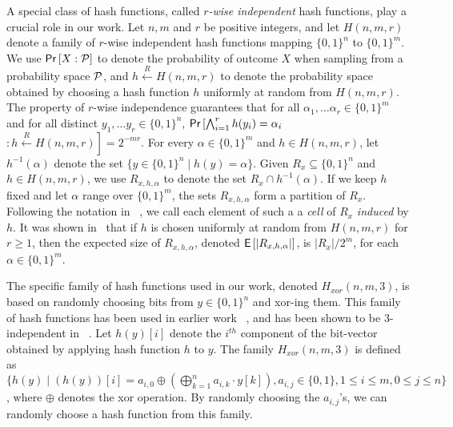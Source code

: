 %
%
%
A special class of hash functions, called \emph{$r$-wise independent} 
hash functions, play a crucial role in our work.
Let $n, m$ and $r$ be positive integers, and let $H(n,m,r)$ denote a
family of $r$-wise independent hash functions mapping $\{0, 1\}^n$ to $\{0, 1\}^m$.  We use 
$\mathsf{Pr}\left[X: {\cal P} \right]$ to denote the probability of outcome 
$X$ when sampling from a probability space ${\cal P}$, and 
$h \xleftarrow{R} H(n,m,r)$ to denote the probability space obtained by
choosing a hash function $h$ uniformly at random from $H(n,m,r)$. The 
property of $r$-wise independence guarantees 
that for all $\alpha_1, \ldots \alpha_r \in \{0,1\}^m $ and
for all distinct $y_1, \ldots y_r \in \{0,1\}^n$, 
$\mathsf{Pr}\left[\bigwedge_{i=1}^r h(y_i) = \alpha_i\right.$ $\left.: 
h \xleftarrow{R} H(n, m, r)\right] = 2^{-mr}$.  For every $\alpha \in
\{0, 1\}^m$ and $h \in H(n, m, r)$, let $h^{-1}(\alpha)$ denote the
set $\{y \in \{0, 1\}^n \mid h(y) = \alpha\}$.  Given $R_x \subseteq
\{0, 1\}^n$ and $h \in H(n, m, r)$, we use $R_{x, h, \alpha}$ to
denote the set $R_x \cap h^{-1}(\alpha)$.  If we keep $h$ fixed and
let $\alpha$ range over $\{0, 1\}^m$, the sets $R_{x, h, \alpha}$ form
a partition of $R_x$.  Following the notation in ~\cite{Bellare98uniformgeneration}, we call each element of
such a  a \emph{cell} of $R_x$ \emph{induced} by $h$.  It was 
shown in~\cite{Bellare98uniformgeneration} that if $h$ is chosen
uniformly at random from $H(n, m,r)$ for $r \ge 1$, then the expected 
size of $R_{x,h,\alpha}$, 
denoted $\mathsf{E}\left[|R_{x,h,\alpha}|\right]$,
is $|R_x|/2^m$, for each $\alpha \in \{0, 1\}^m$.

 The specific family of hash functions used in our work, denoted
 $H_{xor}(n, m, 3)$, is based on randomly choosing bits from $y \in
 \{0, 1\}^n$ and xor-ing them. This family of hash functions has been
 used in earlier work ~\cite{gomes2006model}, and has been shown to be
 3-independent in ~\cite{Gomes-Sampling}.  Let $h(y)[i]$ denote the
 $i^{th}$ component of the bit-vector obtained by applying hash
 function $h$ to $y$.  The family $H_{xor}(n, m, 3)$ is defined as
 $\{h(y) \mid (h(y))[i] = a_{i,0} \oplus (\bigoplus_{k=1}^n
 a_{i,k}\cdot y[k]), a_{i,j} \in \{0, 1\}, 1 \leq i \leq m, 0 \leq j
 \leq n\}$, where $\oplus$ denotes the xor operation.  By randomly
 choosing the $a_{i,j}$'s, we can randomly choose a hash function from
 this family.
